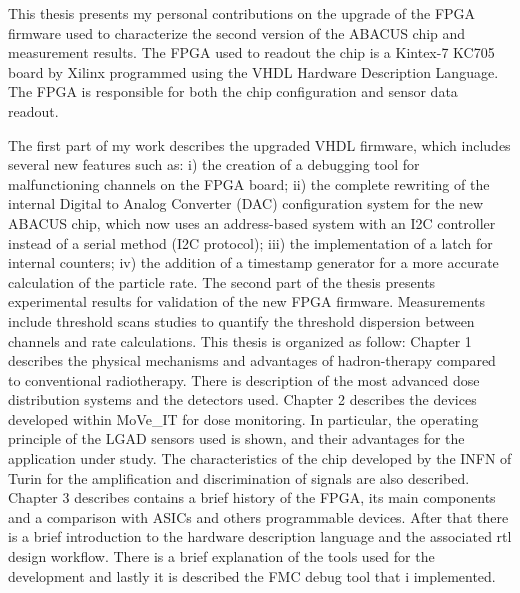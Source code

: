 \newpage
\thispagestyle{plain}
This thesis presents my personal contributions on the upgrade of the FPGA firmware used to characterize
the second version of the ABACUS chip and measurement results.
The FPGA used to readout the chip is a Kintex-7 KC705 board by Xilinx programmed using the VHDL Hardware Description Language. The FPGA
is responsible for both the chip configuration and sensor data readout.

\noindent The first part of my work describes the upgraded VHDL firmware, which includes several new features such as:
i) the creation of a debugging tool for malfunctioning channels on the FPGA board;
ii) the complete rewriting of the internal Digital to Analog Converter (DAC) configuration system for the new ABACUS chip, which
now uses an address-based system with an I2C controller instead of a serial method (I2C protocol);
iii) the implementation of a latch for internal counters;
iv) the addition of a timestamp generator for a more accurate calculation of the particle rate.
\newline
The second part of the thesis presents experimental results for validation of the new FPGA firmware.
Measurements include threshold scans studies to quantify the threshold dispersion between channels and rate calculations.
\vspace{1cm}
\newline
This thesis is organized as follow:
\vspace{0.25cm}
\newline
Chapter 1 describes the physical mechanisms and advantages of hadron-therapy compared to conventional radiotherapy. There is description of the most advanced dose distribution systems and the detectors used.
\vspace{0.25cm}
\newline
Chapter 2 describes the devices developed within MoVe\_IT for dose monitoring. In particular, the operating principle of the LGAD sensors used is shown, and their advantages for the application under study. The characteristics of the chip developed by the INFN of Turin for the amplification and discrimination of signals are also described.
\vspace{0.25cm}
\newline
Chapter 3 describes contains a brief history of the FPGA, its main components and a comparison with ASICs and others programmable devices. After that there is a brief introduction to the hardware description language and the associated rtl design workflow. There is a brief explanation of the tools used for the development and lastly it is described the FMC debug tool that i implemented.
